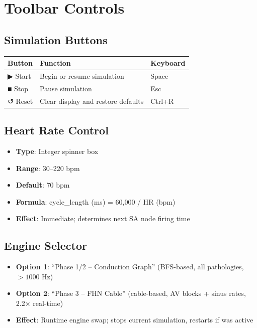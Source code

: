 \documentclass[12pt]{book}
\begin{document}
\section{Toolbar Controls}

\subsection{Simulation Buttons}

\begin{tabular}{|l|l|l|}
\hline
\textbf{Button} & \textbf{Function} & \textbf{Keyboard} \\
\hline
▶ Start & Begin or resume simulation & Space \\
■ Stop & Pause simulation & Esc \\
↺ Reset & Clear display and restore defaults & Ctrl+R \\
\hline
\end{tabular}

\subsection{Heart Rate Control}

\begin{itemize}
  \item \textbf{Type}: Integer spinner box
  \item \textbf{Range}: 30--220 bpm
  \item \textbf{Default}: 70 bpm
  \item \textbf{Formula}: cycle\_length (ms) = 60,000 / HR (bpm)
  \item \textbf{Effect}: Immediate; determines next SA node firing time
\end{itemize}

\subsection{Engine Selector}

\begin{itemize}
  \item \textbf{Option 1}: ``Phase 1/2 -- Conduction Graph'' (BFS-based, all pathologies, $>1000$ Hz)
  \item \textbf{Option 2}: ``Phase 3 -- FHN Cable'' (cable-based, AV blocks + sinus rates, 2.2× real-time)
  \item \textbf{Effect}: Runtime engine swap; stops current simulation, restarts if was active
\end{itemize}
\end{document}
